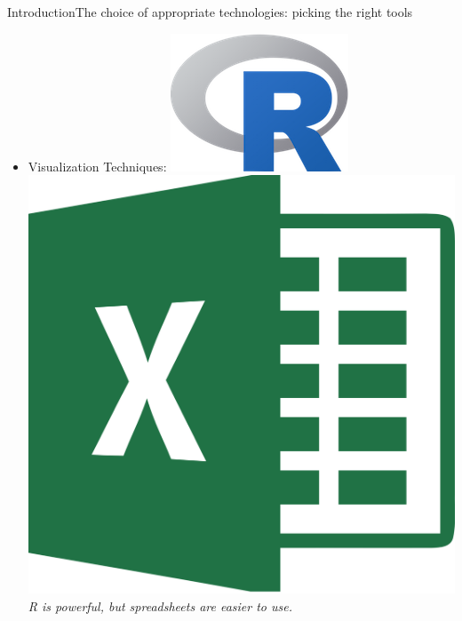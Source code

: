 \begin{frame}{Introduction}{The choice of appropriate technologies: picking the right tools}
\begin{block}{}
\begin{itemize}
			\item<3-> \alert{Visualization Techniques}: \hspace{0.2cm} \includegraphics[scale=0.18, trim=0 2cm 0 0]{../thesis/img/R.png} \hspace{0.4cm} \includegraphics[scale=0.012, trim=0 25cm 0 0]{excel.png} \\\vspace{0.35cm} \emph{R is powerful, but spreadsheets are easier to use.}
	    \end{itemize}
    \end{block}

\end{frame}
